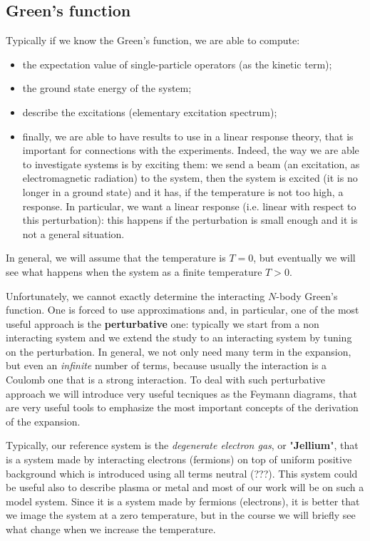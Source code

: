 \documentclass[../main/main.tex]{subfiles}
\begin{document}
\subsection{Green's function}
Typically if we know the Green's function, we are able to compute:
\begin{itemize}
\item the expectation value of single-particle operators (as the kinetic term);
\item the ground state energy of the system;
\item describe the excitations (elementary excitation spectrum);
\item finally, we are able to have results to use in a linear response theory, that is important for connections with the experiments. Indeed, the way we are able to investigate systems is by exciting them: we send a beam (an excitation, as electromagnetic radiation) to the system, then the system is excited (it is no longer in a ground state) and it has, if the temperature is not too high, a response. In particular, we want a linear response (i.e. linear with respect to this perturbation): this happens if the perturbation is small enough and it is not a general situation.
\end{itemize}
In general, we will assume that the temperature is \( T=0 \), but eventually we will see what happens when the system as a finite temperature \( T>0 \).

Unfortunately, we cannot exactly determine the interacting \( N \)-body Green's function. One is forced to use approximations and, in particular, one of the most useful approach is the \textbf{perturbative} one: typically we start from a non interacting system and we extend the study to an interacting system by tuning on the perturbation.
In general, we not only need many term in the expansion, but even an \emph{infinite} number of terms, because usually the interaction is a Coulomb one that is a strong interaction.
To deal with such perturbative approach we will introduce very useful tecniques as the Feymann diagrams, that are very useful tools to emphasize the most important concepts of the derivation of the expansion.

Typically, our reference system is the \emph{degenerate electron gas}, or "\textbf{Jellium}", that is a system made by interacting electrons (fermions) on top of uniform positive background which is introduced using all terms neutral (???). This system could be useful also to describe plasma or metal and most of our work will be on such a model system. Since it is a system made by fermions (electrons), it is better that we image the system at a zero temperature, but in the course we will briefly see what change when we increase the temperature.
\end{document}
